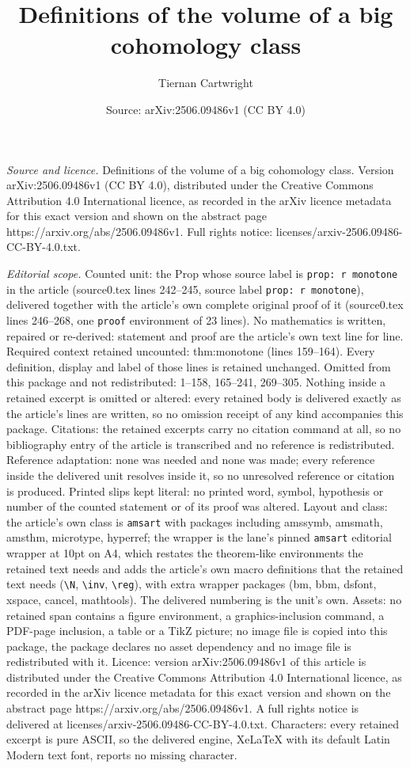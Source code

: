 \documentclass[10pt,a4paper]{amsart}
\title[Definitions of the volume of a big cohomology class]{Definitions of the volume of a big cohomology class}
\author{Tiernan Cartwright}
\date{Source: arXiv:2506.09486v1 (CC BY 4.0)}
\begin{document}
\maketitle

\noindent\emph{Source and licence.} Definitions of the volume of a big cohomology class. Version arXiv:2506.09486v1 (CC BY 4.0), distributed under the Creative Commons Attribution 4.0 International licence, as recorded in the arXiv licence metadata for this exact version and shown on the abstract page https://arxiv.org/abs/2506.09486v1. Full rights notice: licenses/arxiv-2506.09486-CC-BY-4.0.txt.\par\smallskip

\noindent\textit{Editorial scope.} Counted unit: the Prop whose source label is \texttt{prop: r monotone} in the article (source0.tex lines 242--245, source label \texttt{prop: r monotone}), delivered together with the article's own complete original proof of it (source0.tex lines 246--268, one \texttt{proof} environment of 23 lines). No mathematics is written, repaired or re-derived: statement and proof are the article's own text line for line. Required context retained uncounted: thm:monotone (lines 159--164). Every definition, display and label of those lines is retained unchanged. Omitted from this package and not redistributed: 1--158, 165--241, 269--305. Nothing inside a retained excerpt is omitted or altered: every retained body is delivered exactly as the article's lines are written, so no omission receipt of any kind accompanies this package. Citations: the retained excerpts carry no citation command at all, so no bibliography entry of the article is transcribed and no reference is redistributed. Reference adaptation: none was needed and none was made; every reference inside the delivered unit resolves inside it, so no unresolved reference or citation is produced. Printed slips kept literal: no printed word, symbol, hypothesis or number of the counted statement or of its proof was altered. Layout and class: the article's own class is \texttt{amsart} with packages including amssymb, amsmath, amsthm, microtype, hyperref; the wrapper is the lane's pinned \texttt{amsart} editorial wrapper at 10pt on A4, which restates the theorem-like environments the retained text needs and adds the article's own macro definitions that the retained text needs (\texttt{\textbackslash N}, \texttt{\textbackslash inv}, \texttt{\textbackslash reg}), with extra wrapper packages (bm, bbm, dsfont, xspace, cancel, mathtools). The delivered numbering is the unit's own. Assets: no retained span contains a figure environment, a graphics-inclusion command, a PDF-page inclusion, a table or a TikZ picture; no image file is copied into this package, the package declares no asset dependency and no image file is redistributed with it. Licence: version arXiv:2506.09486v1 of this article is distributed under the Creative Commons Attribution 4.0 International licence, as recorded in the arXiv licence metadata for this exact version and shown on the abstract page https://arxiv.org/abs/2506.09486v1. A full rights notice is delivered at licenses/arxiv-2506.09486-CC-BY-4.0.txt. Characters: every retained excerpt is pure ASCII, so the delivered engine, XeLaTeX with its default Latin Modern text font, reports no missing character.
\end{document}
